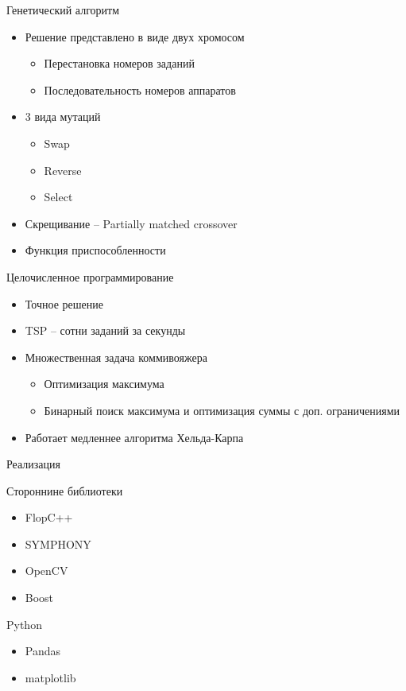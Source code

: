\documentclass{beamer}
\begin{document}
\begin{frame}{Генетический алгоритм}

\begin{itemize}
\item Решение представлено в виде двух хромосом
\begin{itemize}
\item Перестановка номеров заданий
\item Последовательность номеров аппаратов
\end{itemize}

\item 3 вида мутаций
\begin{itemize}
\item Swap
\item Reverse
\item Select
\end{itemize}

\item Скрещивание -- Partially matched crossover
\item Функция приспособленности
\end{itemize}

\end{frame}

\begin{frame}{Целочисленное программирование}
\begin{itemize}
\item Точное решение
\item TSP -- сотни заданий за секунды
\item Множественная задача коммивояжера
    \begin{itemize}
    \item Оптимизация максимума
    \item Бинарный поиск максимума и оптимизация суммы с доп. ограничениями
    \end{itemize}

\item Работает медленнее алгоритма Хельда-Карпа
\end{itemize}
\end{frame}

\begin{frame}{Реализация}


Стороннине библиотеки
\begin{itemize}
\item FlopC++
\item SYMPHONY
\item OpenCV
\item Boost
\end{itemize}

Python
\begin{itemize}
\item Pandas
\item matplotlib
\end{itemize}

\end{frame}
\end{document}
